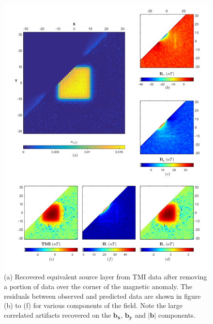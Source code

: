 \begin{figure}[h!]
\centering
\includegraphics[scale=0.55]{ES_Li_CornerOut}
\caption{(a) Recovered equivalent source layer from TMI data after removing a portion of data over the corner of the magnetic anomaly. The residuals between observed and predicted data are shown in figure (b) to (f) for various components of the field. Note the large correlated artifacts recovered on the $\mathbf{b_x}$, $\mathbf{b_y}$ and $\mathbf{|b|}$ components.}
\label{fig:ES_Li_CornerOut}
\end{figure}


\endinput

